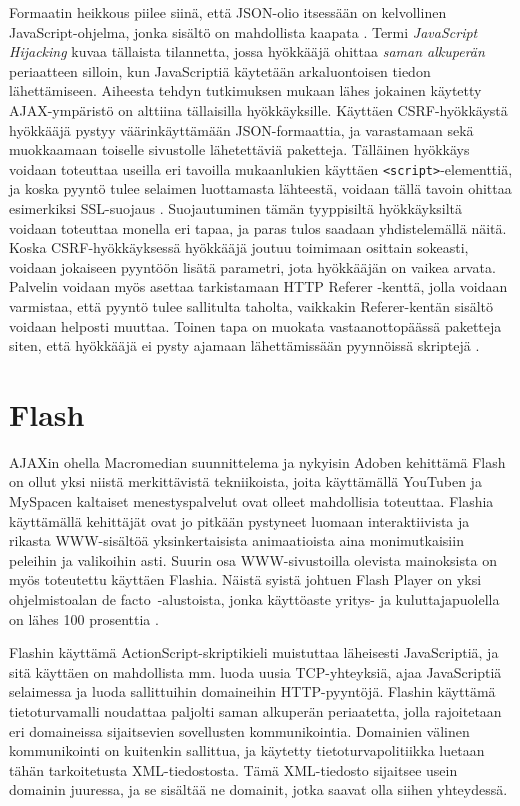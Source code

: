 Formaatin heikkous piilee siinä, että JSON-olio itsessään on
kelvollinen JavaScript-ohjelma, jonka sisältö on mahdollista kaapata
\cite{AJAX}. Termi \emph{JavaScript Hijacking} kuvaa tällaista
tilannetta, jossa hyökkääjä ohittaa \emph{saman alkuperän} periaatteen
silloin, kun JavaScriptiä käytetään arkaluontoisen tiedon
lähettämiseen. Aiheesta tehdyn tutkimuksen \cite{JSH} mukaan lähes
jokainen käytetty AJAX-ympäristö on alttiina tällaisilla
hyökkäyksille. Käyttäen CSRF-hyökkäystä hyökkääjä pystyy
väärinkäyttämään JSON-for\-maat\-ti\-a, ja varastamaan sekä muokkaamaan
toiselle sivustolle lähetettäviä paketteja.  Tälläinen hyökkäys
voidaan toteuttaa useilla eri tavoilla mukaanlukien käyttäen
\texttt{<script>}-elementtiä, ja koska pyyntö tulee selaimen luottamasta
lähteestä, voidaan tällä tavoin ohittaa esimerkiksi SSL-suojaus
\cite{AJAX}. Suojautuminen tämän tyyppisiltä hyökkäyksiltä voidaan
toteuttaa monella eri tapaa, ja paras tulos saadaan yhdistelemällä
näitä. Koska CSRF-hyök\-käyk\-ses\-sä hyökkääjä joutuu toimimaan osittain
sokeasti, voidaan jokaiseen pyyntöön lisätä parametri, jota hyökkääjän
on vaikea arvata. Palvelin voidaan myös asettaa tarkistamaan HTTP
Referer -kenttä, jolla voidaan varmistaa, että pyyntö tulee sallitulta
taholta, vaikkakin Referer-kentän sisältö voidaan helposti
muuttaa. Toinen tapa on muokata vastaanottopäässä paketteja siten,
että hyökkääjä ei pysty ajamaan lähettämissään pyynnöissä skriptejä
\cite{JSH}.

\section{Flash}

AJAXin ohella Macromedian suunnittelema ja nykyisin Adoben kehittämä
Flash on ollut yksi niistä merkittävistä tekniikoista, joita käyttämällä
YouTuben ja MySpacen kaltaiset menestyspalvelut ovat olleet
mahdollisia toteuttaa. Flashia käyttämällä kehittäjät ovat jo pitkään
pystyneet luomaan interaktiivista ja rikasta WWW-sisältöä
yksinkertaisista animaatioista aina monimutkaisiin peleihin ja
valikoihin asti. Suurin osa WWW-si\-vus\-toil\-la olevista mainoksista on
myös toteutettu käyttäen Flashia. Näistä syistä johtuen Flash Player
on yksi ohjelmistoalan de facto~-alustoista, jonka käyttöaste yritys-
ja kuluttajapuolella on lähes 100 prosenttia \cite{Flash}.

Flashin käyttämä ActionScript-skriptikieli muistuttaa läheisesti
JavaScriptiä, ja sitä käyttäen on mahdollista mm. luoda uusia
TCP-yhteyksiä, ajaa JavaScriptiä selaimessa ja luoda sallittuihin
domaineihin HTTP-pyyn\-tö\-jä. Flashin käyttämä tietoturvamalli noudattaa
paljolti saman alkuperän periaatetta, jolla rajoitetaan eri
domaineissa sijaitsevien sovellusten kommunikointia. Domainien välinen
kommunikointi on kuitenkin sallittua, ja käytetty tietoturvapolitiikka
luetaan tähän tarkoitetusta XML-tiedostosta. Tämä XML-tiedosto
sijaitsee usein domainin juuressa, ja se sisältää ne domainit, jotka
saavat olla siihen yhteydessä.

